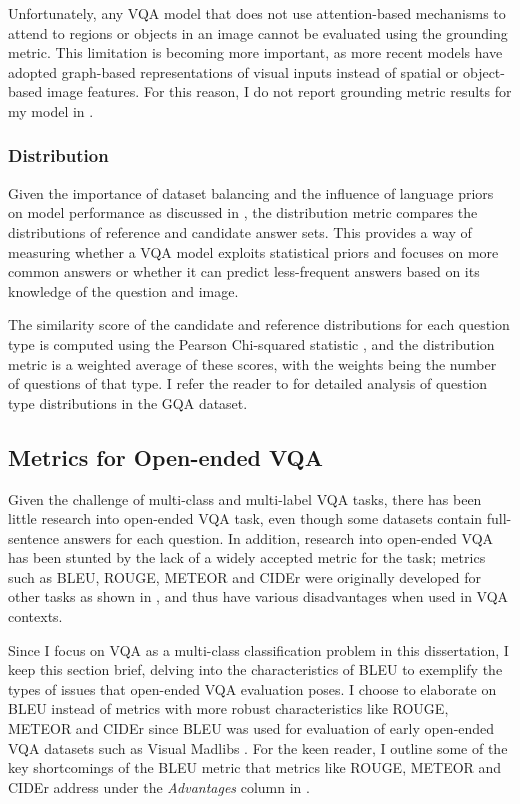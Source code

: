 Unfortunately, any VQA model that does not use attention-based mechanisms to attend to regions or objects in an image cannot be evaluated using the grounding metric. This limitation is becoming more important, as more recent models have adopted graph-based representations of visual inputs instead of spatial or object-based image features. For this reason, I do not report grounding metric results for my model in \chapterautorefname{ \ref{chap:results}}.

\subsubsection{Distribution}

Given the importance of dataset balancing and the influence of language priors on model performance as discussed in \sectionautorefname{ \ref{section:vqa_datasets}}, the distribution metric compares the distributions of reference and candidate answer sets. This provides a way of measuring whether a VQA model exploits statistical priors and focuses on more common answers or whether it can predict less-frequent answers based on its knowledge of the question and image.

The similarity score of the candidate and reference distributions for each question type is computed using the Pearson Chi-squared statistic \cite{pearson1900x}, and the distribution metric is a weighted average of these scores, with the weights being the number of questions of that type. I refer the reader to \cite{hudson2019gqa} for detailed analysis of question type distributions in the GQA dataset.

\subsection{Metrics for Open-ended VQA}
\label{subsection:open_ended_vqa_metrics}

Given the challenge of multi-class and multi-label VQA tasks, there has been little research into open-ended VQA task, even though some datasets contain full-sentence answers for each question. In addition, research into open-ended VQA has been stunted by the lack of a widely accepted metric for the task; metrics such as BLEU, ROUGE, METEOR and CIDEr were originally developed for other tasks as shown in \tableautorefname{ \ref{tab:vqa_metrics_suitability}}, and thus have various disadvantages when used in VQA contexts.

Since I focus on VQA as a multi-class classification problem in this dissertation, I keep this section brief, delving into the characteristics of BLEU to exemplify the types of issues that open-ended VQA evaluation poses. I choose to elaborate on BLEU instead of metrics with more robust characteristics like ROUGE, METEOR and CIDEr since BLEU was used for evaluation of early open-ended VQA datasets such as Visual Madlibs \cite{yu2015visual}. For the keen reader, I outline some of the key shortcomings of the BLEU metric that metrics like ROUGE, METEOR and CIDEr address under the \textit{Advantages} column in \tableautorefname{ \ref{tab:vqa_metrics_comparison}}.

